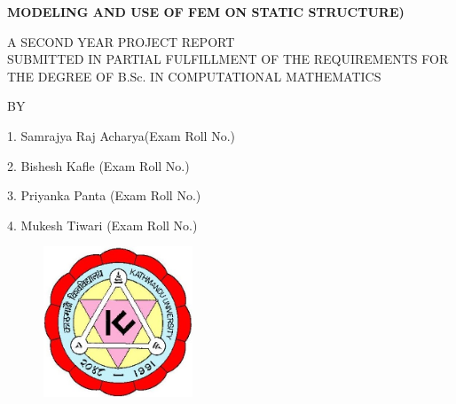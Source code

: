 \documentclass[a4paper,12pt]{report}    %
\begin{document}



{\large
\begin{center}
{{\bf{\color{red}MODELING AND USE OF FEM ON STATIC STRUCTURE)}}}\\
\end{center}


\vspace{0.8cm}

{\normalsize
\begin{center}
A SECOND YEAR PROJECT REPORT\\

\vspace{0.5cm}
SUBMITTED IN PARTIAL FULFILLMENT OF THE REQUIREMENTS FOR\\
THE DEGREE OF B.Sc. IN COMPUTATIONAL MATHEMATICS\\

\vspace{1.0cm}

BY
\end{center}
\begin{center}
\begin{itemize}
\begin{center}
\item[1.] Samrajya Raj Acharya(Exam Roll No.)
\item[2.] Bishesh Kafle (Exam Roll No.)
\item[3.] Priyanka Panta (Exam Roll No.)
\item[4.] Mukesh Tiwari (Exam Roll No.)
\end{center}
\end{itemize}

\end{center}


\vspace{1.0cm}

\begin{figure}[htpb]
\centering
\includegraphics[height=4.5cm,width=4.5cm]{photos/kulogo.jpg}
\end{figure}


}}
\end{document}
